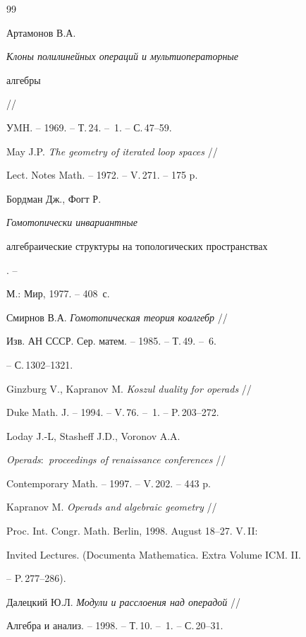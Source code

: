 \begin{thebibliography}{99}







Артамонов В.А. {\em Клоны полилинейных операций и мультиоператорные


алгебры} //


УMH. -- 1969. -- Т.\,24. -- \No\,1. -- С.\,47--59.




May J.P. {\em The geometry of iterated loop spaces} //


Lect. Notes Math. -- 1972. -- V.\,271. -- 175 p.




Бордман Дж., Фогт Р. {\em Гомотопически инвариантные


алгебраические структуры на топологических пространствах}. --


М.: Мир, 1977. -- 408~с.




Смирнов В.А. {\em Гомотопическая теория коалгебр} //


Изв. АН СССР. Сер. матем. -- 1985. -- Т.\,49. -- \No\,6.


-- С.\,1302--1321.




Ginzburg V., Kapranov M. {\em Koszul duality for operads} //


Duke Math. J. -- 1994. -- V.\,76. -- \No\,1. -- P.\,203--272.




Loday J.-L, Stasheff J.D., Voronov A.A.


{\em Operads$:$ proceedings of renaissance conferences} //


Contemporary Math. -- 1997. -- V.\,202. -- 443 p.




Kapranov M. {\em Operads and algebraic geometry} //


Proc. Int. Congr. Math. Berlin, 1998. August 18--27. V.\,II:


Invited Lectures. (Documenta Mathematica. Extra Volume ICM. II.


-- P.\,277--286).




Далецкий Ю.Л. {\em Модули и расслоения над операдой} //


Алгебра и анализ. -- 1998. -- Т.\,10. -- \No\,1. -- С.\,20--31.



\end{thebibliography}
